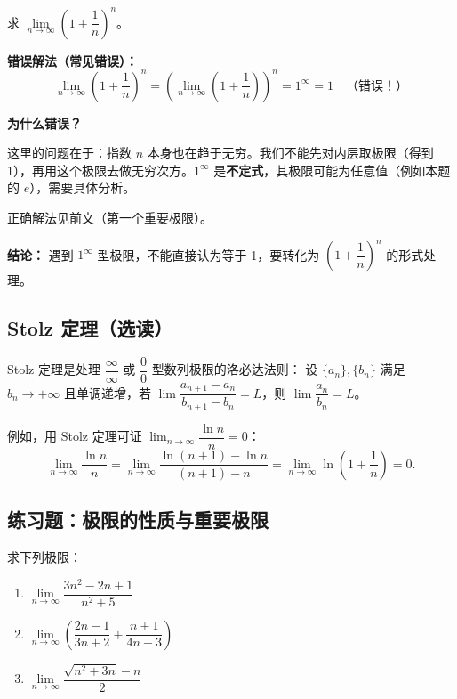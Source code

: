 \documentclass[fontset=fandol]{ctexart}
\newenvironment{extra}{\begin{mdframed}[style=extrastyle, frametitle={* 选读内容（不要求掌握）}]}{\end{mdframed}}
\begin{document}
\begin{example}[错误：拆分乘积中的无穷小量]
求 \(\lim\limits_{n\to\infty} \left(1 + \dfrac{1}{n}\right)^n\)。

\textbf{错误解法（常见错误）：}
\[
\lim_{n\to\infty} \left(1 + \dfrac{1}{n}\right)^n = \left(\lim_{n\to\infty} \left(1 + \dfrac{1}{n}\right)\right)^n = 1^\infty = 1 \quad \text{（错误！）}
\]

\textbf{为什么错误？}

这里的问题在于：指数 \(n\) 本身也在趋于无穷。我们不能先对内层取极限（得到 1），再用这个极限去做无穷次方。\(1^\infty\) 是\textbf{不定式}，其极限可能为任意值（例如本题的 \(e\)），需要具体分析。

正确解法见前文（第一个重要极限）。

\textbf{结论：} 遇到 \(1^\infty\) 型极限，不能直接认为等于 1，要转化为 \((1 + \dfrac{1}{n})^n\) 的形式处理。
\end{example}



\begin{extra}
\subsection*{Stolz 定理（选读）}
Stolz 定理是处理 \(\dfrac{\infty}{\infty}\) 或 \(\dfrac{0}{0}\) 型数列极限的洛必达法则：
设 \(\{a_n\}, \{b_n\}\) 满足 \(b_n \to +\infty\) 且单调递增，若 \(\lim \dfrac{a_{n+1}-a_n}{b_{n+1}-b_n} = L\)，则 \(\lim \dfrac{a_n}{b_n} = L\)。

例如，用 Stolz 定理可证 \(\lim_{n\to\infty} \dfrac{\ln n}{n} = 0\)：
\[
\lim_{n\to\infty} \dfrac{\ln n}{n} = \lim_{n\to\infty} \dfrac{\ln(n+1) - \ln n}{(n+1)-n} = \lim_{n\to\infty} \ln\left(1+\dfrac{1}{n}\right) = 0.
\]
\end{extra}

\subsection*{练习题：极限的性质与重要极限}

\begin{exercise}求下列极限：
\begin{enumerate}
\item \(\lim\limits_{n\to\infty} \dfrac{3n^2 - 2n + 1}{n^2 + 5}\)
\item \(\lim\limits_{n\to\infty} \left(\dfrac{2n-1}{3n+2} + \dfrac{n+1}{4n-3}\right)\)
\item \(\lim\limits_{n\to\infty} \dfrac{\sqrt{n^2 + 3n} - n}{2}\)
\end{enumerate}
\end{exercise}
\end{document}
